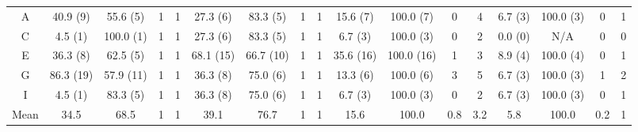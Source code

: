 \begin{landscape}
\begin{table}
\begin{tabular}{@{}ccccccccccccccccc@{}}
      \multicolumn{1}{c|}{A}              & 40.9 (9)  & 55.6 (5)  & 1    & \multicolumn{1}{c|}{1}    & 27.3 (6)                 & 83.3 (5)                 & 1                        & \multicolumn{1}{c|}{1}    & 15.6 (7)  & 100.0 (7)                & 0                        & \multicolumn{1}{c|}{4}    & 6.7 (3)                  & 100.0 (3)                & 0                        & 1                        \\
      \multicolumn{1}{c|}{C}              & 4.5 (1)   & 100.0 (1) & 1    & \multicolumn{1}{c|}{1}    & 27.3 (6)                 & 83.3 (5)                 & 1                        & \multicolumn{1}{c|}{1}    & 6.7 (3)   & 100.0 (3)                & 0                        & \multicolumn{1}{c|}{2}    & 0.0 (0)                  & N/A                      & 0                        & 0                        \\
      \multicolumn{1}{c|}{E}              & 36.3 (8)  & 62.5 (5)  & 1    & \multicolumn{1}{c|}{1}    & 68.1 (15)                & 66.7 (10)                & 1                        & \multicolumn{1}{c|}{1}    & 35.6 (16) & 100.0 (16)               & 1                        & \multicolumn{1}{c|}{3}    & 8.9 (4)                  & 100.0 (4)                & 0                        & 1                        \\
      \multicolumn{1}{c|}{G}              & 86.3 (19) & 57.9 (11) & 1    & \multicolumn{1}{c|}{1}    & 36.3 (8)                 & 75.0 (6)                 & 1                        & \multicolumn{1}{c|}{1}    & 13.3 (6)  & 100.0 (6)                & 3                        & \multicolumn{1}{c|}{5}    & 6.7 (3)                  & 100.0 (3)                & 1                        & 2                        \\
      \multicolumn{1}{c|}{I}              & 4.5 (1)   & 83.3 (5)  & 1    & \multicolumn{1}{c|}{1}    & 36.3 (8)                 & 75.0 (6)                 & 1                        & \multicolumn{1}{c|}{1}    & 6.7 (3)   & 100.0 (3)                & 0                        & \multicolumn{1}{c|}{2}    & 6.7 (3)                  & 100.0 (3)                & 0                        & 1                        \\ \midrule
      \multicolumn{1}{l|}{Mean}           & 34.5      & 68.5      & 1    & \multicolumn{1}{c|}{1}    & 39.1                     & 76.7                     & 1                        & \multicolumn{1}{c|}{1}    & 15.6      & 100.0                    & 0.8                      & \multicolumn{1}{c|}{3.2}  & 5.8                      & 100.0                    & 0.2                      & 1                        \\

\end{tabular}
\end{table}
\end{landscape}
